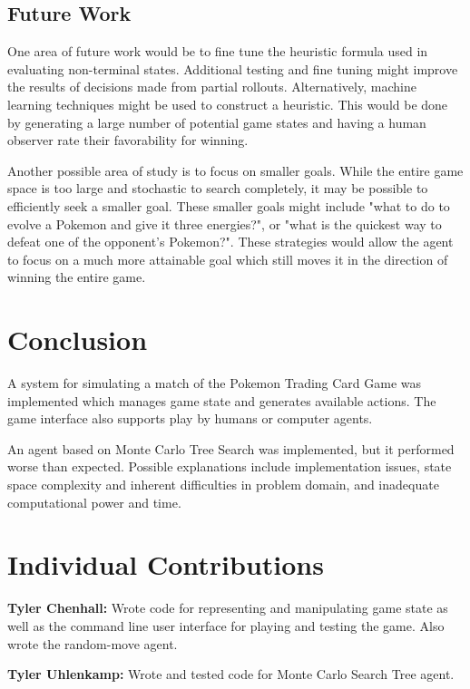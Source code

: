 \documentclass{article}
\begin{document}
\subsection{Future Work}
One area of future work would be to fine tune the heuristic formula used in evaluating non-terminal states.  Additional testing and fine tuning might improve the results of decisions made from partial rollouts.  Alternatively, machine learning techniques might be used to construct a heuristic.  This would be done by generating a large number of potential game states and having a human observer rate their favorability for winning.

Another possible area of study is to focus on smaller goals.  While the entire game space is too large and stochastic to search completely, it may be possible to efficiently seek a smaller goal.  These smaller goals might include "what to do to evolve a Pokemon and give it three energies?", or "what is the quickest way to defeat one of the opponent's Pokemon?".  These strategies would allow the agent to focus on a much more attainable goal which still moves it in the direction of winning the entire game.

\section{Conclusion} %
A system for simulating a match of the Pokemon Trading Card Game was implemented which manages game state and generates available actions. The game interface also supports play by humans or computer agents.

An agent based on Monte Carlo Tree Search was implemented, but it performed worse than expected. Possible explanations include implementation issues, state space complexity and inherent difficulties in problem domain, and inadequate computational power and time. 

\section{Individual Contributions}%
\textbf{Tyler Chenhall: } Wrote code for representing and manipulating game state as well as the command line user interface for  playing and testing the game. Also wrote the random-move agent. 

\textbf{Tyler Uhlenkamp: } Wrote and tested code for Monte Carlo Search Tree agent. 





\end{document}
